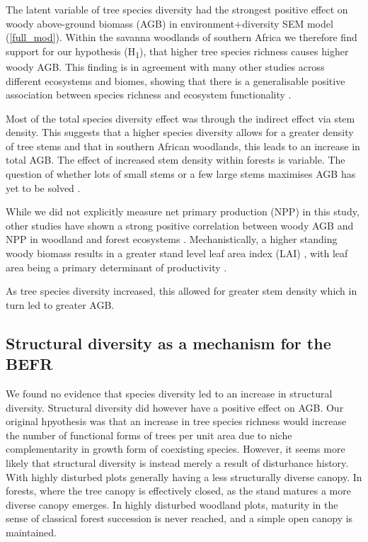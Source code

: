 \documentclass[11pt,a4paper]{article}
\begin{document}
The latent variable of tree species diversity had the strongest positive effect on woody above-ground biomass (AGB) in environment+diversity SEM model (\autoref{full_mod}). Within the savanna woodlands of southern Africa we therefore find support for our hypothesis (H\textsubscript{1}), that higher tree species richness causes higher woody AGB. This finding is in agreement with many other studies across different ecosystems and biomes, showing that there is a generalisable positive association between species richness and ecosystem functionality \citep{}. 

Most of the total species diversity effect was through the indirect effect via stem density. This suggests that a higher species diversity allows for a greater density of tree stems and that in southern African woodlands, this leads to an increase in total AGB. The effect of increased stem density within forests is variable. The question of whether lots of small stems or a few large stems maximises AGB has yet to be solved \citep{}.

While we did not explicitly measure net primary production (NPP) in this study, other studies have shown a strong positive correlation between woody AGB and NPP in woodland and forest ecosystems \citep{}. Mechanistically, a higher standing woody biomass results in a greater stand level leaf area index (LAI) \citep{}, with leaf area being a primary determinant of productivity \citep{}.

As tree species diversity increased, this allowed for greater stem density which in turn led to greater AGB.

\subsection{Structural diversity as a mechanism for the BEFR}

We found no evidence that species diversity led to an increase in structural diversity. Structural diversity did however have a positive effect on AGB. Our original hpyothesis was that an increase in tree species richness would increase the number of functional forms of trees per unit area due to niche complementarity in growth form of coexisting species. However, it seems more likely that structural diversity is instead merely a result of disturbance history. With highly disturbed plots generally having a less structurally diverse canopy. In forests, where the tree canopy is effectively closed, as the stand matures a more diverse canopy emerges. In highly disturbed woodland plots, maturity in the sense of classical forest succession is never reached, and a simple open canopy is maintained.
\end{document}
